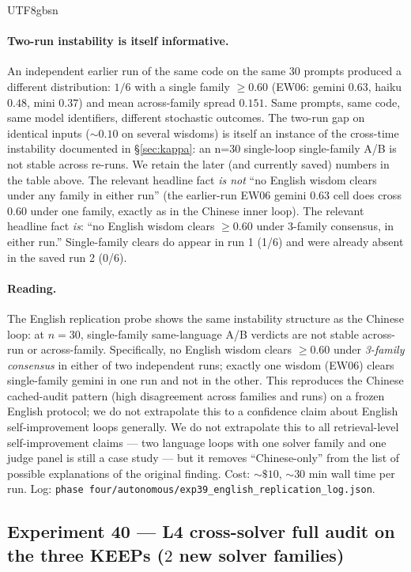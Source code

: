 \documentclass{article}
\begin{document}
\begin{CJK*}{UTF8}{gbsn}
\paragraph{Two-run instability is itself informative.} An
independent earlier run of the same code on the same 30 prompts
produced a different distribution: \(1/6\) with a single family
\(\geq 0.60\) (EW06: gemini \(0.63\), haiku \(0.48\), mini
\(0.37\)) and mean across-family spread \(0.151\). Same prompts,
same code, same model identifiers, different stochastic
outcomes. The two-run gap on identical inputs (\(\sim 0.10\) on
several wisdoms) is itself an instance of the cross-time
instability documented in \S\ref{sec:kappa}: an n=30 single-loop
single-family A/B is not stable across re-runs. We retain the
later (and currently saved) numbers in the table above. The
relevant headline fact \emph{is not} ``no English wisdom clears
under any family in either run'' (the earlier-run EW06 gemini
\(0.63\) cell does cross \(0.60\) under one family, exactly as
in the Chinese inner loop). The relevant headline fact
\emph{is}: ``no English wisdom clears \(\geq 0.60\) under
3-family consensus, in either run.'' Single-family clears do
appear in run 1 (1/6) and were already absent in the saved
run 2 (0/6).

\paragraph{Reading.} The English replication probe shows the
same instability structure as the Chinese loop: at \(n=30\),
single-family same-language A/B verdicts are not stable
across-run or across-family. Specifically, no English wisdom
clears \(\geq 0.60\) under \emph{3-family consensus} in either
of two independent runs; exactly one wisdom (EW06) clears
single-family gemini in one run and not in the other. This
reproduces the Chinese cached-audit pattern (high disagreement
across families and runs) on a frozen English protocol; we do
not extrapolate this to a confidence claim about English
self-improvement loops generally. We do not extrapolate this to
all retrieval-level self-improvement claims --- two language
loops with one solver family and one judge panel is still a case
study --- but it removes ``Chinese-only'' from the list of
possible explanations of the original finding. Cost:
\({\sim}\$10\), \({\sim}30\) min wall time per run. Log:
\texttt{phase four/autonomous/exp39\_english\_replication\_log.json}.

\subsection{Experiment 40 — L4 cross-solver full audit on the
three KEEPs (\(2\) new solver families)}
\label{sec:exp40}


\end{CJK*}
\end{document}

